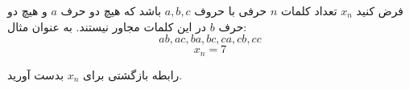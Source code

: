 \exercise
فرض کنید
$x_n$
تعداد کلمات
$n$
حرفی با حروف
$a, b, c$
باشد که هیچ دو حرف
$a$
و هیچ دو حرف
$b$
در این کلمات مجاور نیستند. به عنوان مثال:
$$ab, ac, ba, bc, ca, cb, cc$$
$$x_n = 7$$

رابطه بازگشتی برای
$x_n$
بدست آورید.
